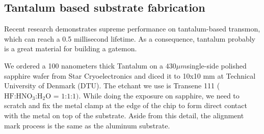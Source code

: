 \subsection{Tantalum based substrate fabrication}

Recent research \cite{RN26, RN67} demonstrates supreme performance on tantalum-based transmon, which can reach a 0.5 millisecond lifetime. As a consequence, tantalum probably is a great material for building a gatemon.

We ordered a 100 nanometers thick Tantalum on a $430\mu m$single-side polished sapphire wafer from Star Cryoelectronics and diced it to 10x10 mm at Technical University of Denmark (DTU). The etchant we use is Transene 111 ($\text{HF:HNO}_3\text{:H}_2\text{O = 1:1:1})$. While doing the exposure on sapphire, we need to scratch and fix the metal clamp at the edge of the chip to form direct contact with the metal on top of the substrate. Aside from this detail, the alignment mark process is the same as the aluminum substrate. 


